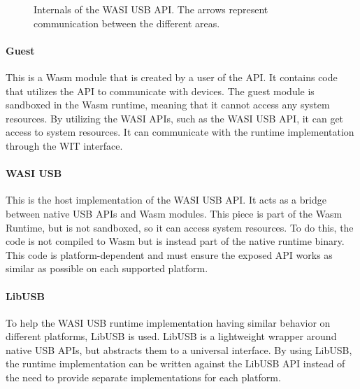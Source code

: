 \begin{figure}[!h]
\centering
{}
\caption{Internals of the WASI USB API. The arrows represent communication between the different areas.}
\label{image:api_areas}
\end{figure}

\paragraph{Guest} This is a Wasm module that is created by a user of the API. It contains code that utilizes the API to communicate with devices. The guest module is sandboxed in the Wasm runtime, meaning that it cannot access any system resources. By utilizing the WASI APIs, such as the WASI USB API, it can get access to system resources. It can communicate with the runtime implementation through the \acrshort{WIT} interface.

\paragraph{WASI USB} This is the host implementation of the WASI USB API. It acts as a bridge between native USB APIs and Wasm modules. This piece is part of the Wasm Runtime, but is not sandboxed, so it can access system resources. To do this, the code is not compiled to Wasm but is instead part of the native runtime binary. This code is platform-dependent and must ensure the exposed API works as similar as possible on each supported platform.

\paragraph{LibUSB} To help the WASI USB runtime implementation having similar behavior on different platforms, LibUSB is used. LibUSB is a lightweight wrapper around native USB APIs, but abstracts them to a universal interface. By using LibUSB, the runtime implementation can be written against the LibUSB API instead of the need to provide separate implementations for each platform.

